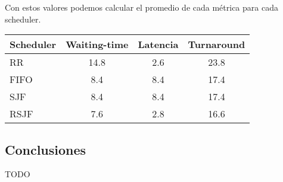 Con estos valores podemos calcular el promedio de cada métrica para cada scheduler.

\begin{center}
        \begin{tabular}{| l | c | c | c |}
                \hline
    Scheduler & Waiting-time & Latencia & Turnaround \\
                \hline
    RR   &    14.8 &  2.6 & 23.8 \\
    FIFO &     8.4 &  8.4 & 17.4 \\
    SJF  &     8.4 &  8.4 & 17.4 \\
    RSJF &     7.6 &  2.8 & 16.6 \\
                \hline
        \end{tabular}
\end{center}

\subsection{Conclusiones}

TODO

